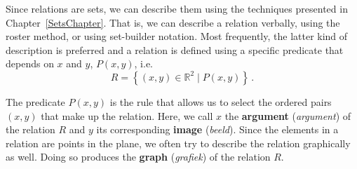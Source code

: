 Since relations are sets, we can describe them using the techniques presented in Chapter~\ref{SetsChapter}.  That is, we can describe a relation verbally, using the roster method, or using set-builder notation. Most frequently, the latter kind of description is preferred and a relation is defined using a specific predicate that depends on $x$ and $y$, $P(x,y)$, i.e. 
$$
R=\left\{(x,y)\in\mathbb{R}^2\mid P(x,y) \right\}\,.
$$

The predicate  $P(x,y)$ is the rule that allows us to select the ordered pairs $(x,y)$ that make up the relation. Here, we call $x$ the \textbf{argument} (\textit{argument}) of the relation $R$ and $y$ its corresponding \textbf{image} (\textit{beeld}). Since the elements in a relation are points in the plane, we often try to describe the relation graphically as well.  Doing so produces the \textbf{graph} (\textit{grafiek}) of the relation $R$.


